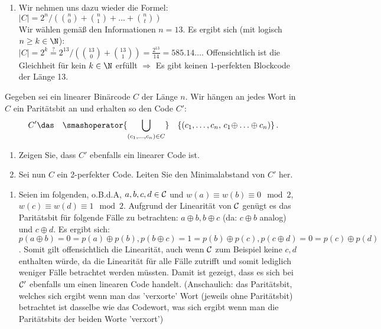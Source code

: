 \begin{aufgabe}[Perfektion][3]
\begin{enumerate}[label=\alph*)]
    \item Wir nehmen uns dazu wieder die Formel:  \\
    \(|C| = 2^n \Big/ \left(\binom{n}{0} + \binom{n}{1} + \ldots + \binom{n}{t}\right)\) \\
    Wir wählen gemäß den Informationen \(n=13\). Es ergibt sich (mit logisch \(n \geq k \in \N\)): \\
    \(|C| = 2^k \overset{?}{=} 2^{13} \Big/ \left(\binom{13}{0} + \binom{13}{1}\right) = \frac{2^{13}}{14} = 585.14 \ldots\). Offensichtlich ist die Gleichheit für kein \(k \in \N\) erfüllt \(\Rightarrow\) Es gibt keinen \(1\)-perfekten Blockcode der Länge 13. 
\end{enumerate}
\end{aufgabe}
\clearpage
\begin{aufgabe}[Paritätscode][4]
Gegeben sei ein linearer Binärcode \(C\) der Länge \(n\). Wir hängen an jedes
Wort in \(C\) ein Paritätsbit an und erhalten so den Code \(C'\):
\[
    C' \das \quad\smashoperator{\bigcup_{\substack{(c_1,...,c_n)\in
    C}}}\quad \{(c_1,\dots,c_n,\,c_1\!\oplus \ldots \oplus c_n)\} \,.
\]
\begin{enumerate}[label=\alph*)]
\narrowitems
    \item Zeigen Sie, dass \(C'\) ebenfalls ein linearer Code ist.
    \item Sei nun \(C\) ein 2-perfekter Code.
        Leiten Sie den Minimalabstand von \(C'\) her.
\end{enumerate}
\Splitter
\begin{enumerate}[label=\alph*)]\narrowitems
    \item Seien im folgenden, o.B.d.A, \(a,b,c,d \in {\cal C}\) und \(w(a) \equiv w(b) \equiv 0 \mod 2\), \(w(c) \equiv w(d) \equiv 1 \mod 2\). Aufgrund der Linearität von \({\cal C}\) genügt es das Paritätsbit für folgende Fälle zu betrachten: \(a \oplus b, b \oplus c\) (da: \(c \oplus b\) analog) und \(c \oplus d\). Es ergibt sich:\\
    \(p(a\oplus b) = 0 = p(a) \oplus p(b), p(b \oplus c) = 1 = p(b) \oplus p(c), p(c \oplus d) = 0 = p(c) \oplus p(d)\). Somit gilt offensichtlich die Linearität, auch wenn \({\cal C}\) zum Beispiel keine \(c,d\) enthalten würde, da die Linearität für alle Fälle zutrifft und somit lediglich weniger Fälle betrachtet werden müssten. Damit ist gezeigt, dass es sich bei \({\cal C}'\) ebenfalls um einen linearen Code handelt. (Anschaulich: das Paritätsbit, welches sich ergibt wenn man das 'verxorte' Wort (jeweils ohne Paritätsbit) betrachtet ist dasselbe wie das Codewort, was sich ergibt wenn man die Paritätsbits der beiden Worte 'verxort')\hfill \qedsymbol

\end{enumerate}
\end{aufgabe}
